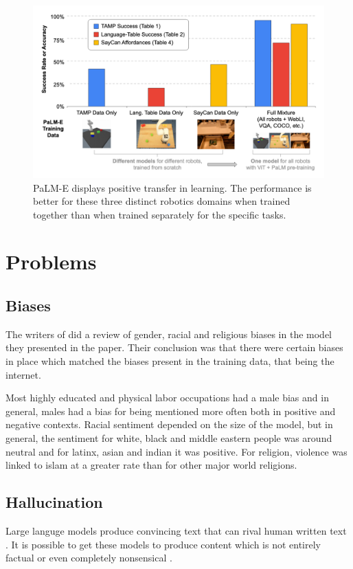 \documentclass[twoside]{article}
\begin{document}
\begin{figure}[h]
  \centering
  \includegraphics*[scale=0.1]{img/palm-e-transfer.png}
  \caption{
    PaLM-E displays positive transfer in learning. The performance is better for these three
    distinct robotics domains when trained together than when trained separately for the 
    specific tasks. \cite{driess_palm-e_2023}
  }
\end{figure}


\section{Problems}
\subsection{Biases}
The writers of \cite{brown_language_2020} did a review of gender, racial and religious
biases in the model they presented in the paper. Their conclusion was that there were
certain biases in place which matched the biases present in the training data, that being
the internet. 

Most highly educated and physical labor occupations had a male bias and in general, males
had a bias for being mentioned more often both in positive and negative contexts. Racial
sentiment depended on the size of the model, but in general, the sentiment for white,
black and middle eastern people was around neutral and for latinx, asian and indian it was
positive. For religion, violence was linked to islam at a greater rate than for other
major world religions.

\subsection{Hallucination}
Large languge models produce convincing text that can rival human written text \cite{brown_language_2020}.
It is possible to get these models to produce content which is 
not entirely factual or even completely nonsensical \cite{ji_survey_2023}. 
\end{document}
